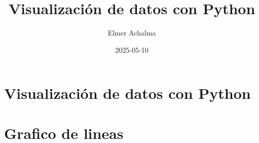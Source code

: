 \documentclass[
  jou,
  floatsintext,
  longtable,
  a4paper,
  nolmodern,
  notxfonts,
  notimes,
  12pt,
  colorlinks=true,linkcolor=blue,citecolor=blue,urlcolor=blue]{apa7}
\title{Visualización de datos con Python}
\author{Elmer Achalma}
\date{2025-05-10}
\begin{document}
\maketitle


\hypertarget{toc}{}
\tableofcontents
\newpage
\section[Introduction]{Visualización de datos con Python}

\setcounter{secnumdepth}{3}

\setlength\LTleft{0pt}




\section{Grafico de lineas}\label{grafico-de-lineas}
\end{document}
